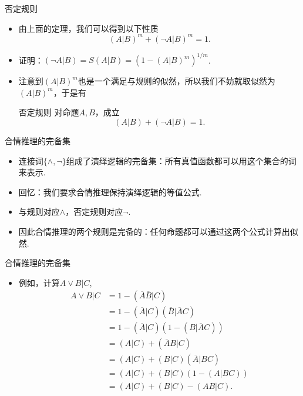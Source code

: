 \begin{frame}{否定规则}
\begin{itemize}
    \item 由上面的定理，我们可以得到以下性质
    \begin{equation*}
        (A|B)^m + (\neg A|B)^m = 1.
    \end{equation*}
    \item 证明：$(\neg A|B) = S(A|B) = (1 - (A|B)^m)^{1/m}$.
    \item 注意到$(A|B)^m$也是一个满足与规则的似然，所以我们不妨就取似然为$(A|B)^m$，于是有
    \begin{block}{否定规则}
    对命题$A,B$，成立
    \[(A|B) + (\neg A|B) = 1.\]
    \end{block}
\end{itemize}
\end{frame}

\begin{frame}{合情推理的完备集}
\begin{itemize}
    \item 连接词$\{\wedge,\neg\}$组成了演绎逻辑的完备集：所有真值函数都可以用这个集合的词来表示.
    \item 回忆：我们要求合情推理保持演绎逻辑的等值公式.
    \item 与规则对应$\wedge$，否定规则对应$\neg$.
    \item 因此合情推理的两个规则是完备的：任何命题都可以通过这两个公式计算出似然.
\end{itemize}
\end{frame}

\begin{frame}{合情推理的完备集}
\begin{itemize}
    \item 例如，计算$A\vee B|C$,
    \begin{align*}
        A \vee B|C 
        &= 1 - (\overline{A}\overline{B}|C)\\
        & = 1 - (\overline{A}|C)(\overline{B}|\overline{A}C) \\
        &= 1 - (\overline{A}|C)(1 - (B|\overline{A}C))\\
        &= (A|C) + (\overline{A}B|C) \\
        &= (A|C) + (B|C)(\overline{A}|BC) \\
        &= (A|C) + (B|C)(1 - (A|BC)) \\
        &= (A|C) + (B|C) - (AB|C).
    \end{align*}
\end{itemize}
\end{frame}

